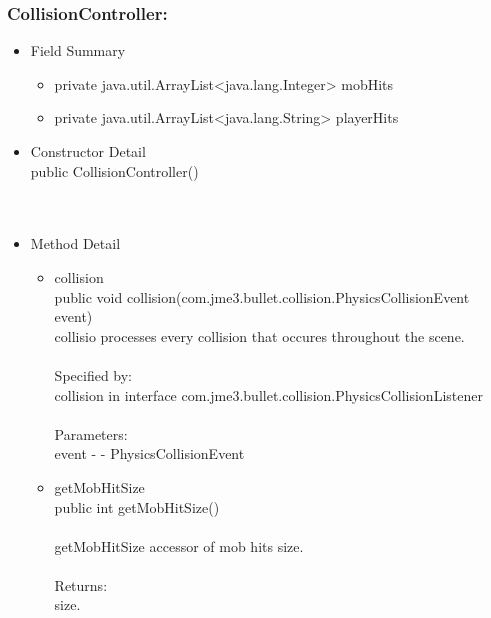 \documentclass[letterpaper]{article}
\begin{document}
									\subsubsection*{CollisionController:}
									\vspace{0.1in}	
										\begin{itemize}
											\item	Field Summary
													\begin{itemize}
														\item	private java.util.ArrayList<java.lang.Integer>	mobHits 
														\item	private java.util.ArrayList<java.lang.String>	playerHits 
													\end{itemize}
											\item	Constructor Detail \\
													public CollisionController() \\ \\ \\
											\item	Method Detail
													\begin{itemize}
														\item	collision \\
																public void collision(com.jme3.bullet.collision.PhysicsCollisionEvent event) \\
																collisio processes every collision that occures throughout the scene. \\ \\
																Specified by: \\
																collision in interface com.jme3.bullet.collision.PhysicsCollisionListener \\ \\
																Parameters: \\
																event - - PhysicsCollisionEvent \\
														\item	getMobHitSize \\
																public int getMobHitSize() \\ \\
																getMobHitSize accessor of mob hits size. \\ \\
																Returns: \\
																size. \\

\end{itemize}
\end{itemize}
\end{document}
